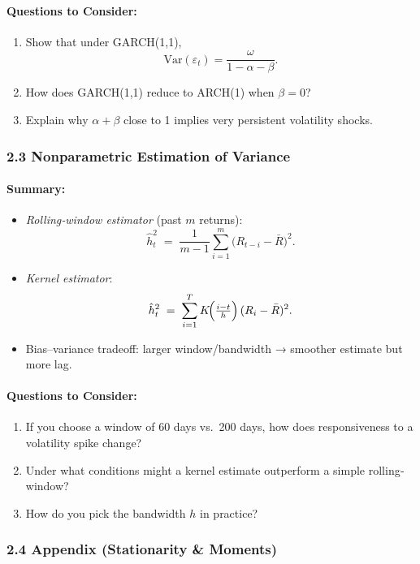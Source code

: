 \documentclass[11pt]{amsart}
\begin{document}
\paragraph{Questions to Consider:}
\begin{enumerate}[noitemsep,left=0pt]
	\item Show that under GARCH(1,1), \[\mathrm{Var}(\varepsilon_t) = \frac{\omega}{1 - \alpha - \beta}.\]
	\item How does GARCH(1,1) reduce to ARCH(1) when $\beta = 0$?
	\item Explain why $\alpha + \beta$ close to 1 implies very persistent volatility shocks.
\end{enumerate}

\subsubsection{2.3 Nonparametric Estimation of Variance}
\paragraph{Summary:}
\begin{itemize}[noitemsep,left=0pt]
	\item \emph{Rolling‐window estimator} (past $m$ returns):
	      \[
		      \hat h_t^2 \;=\; \frac{1}{m - 1}\sum_{i=1}^m \bigl(R_{t-i} - \bar{R}\bigr)^2.
	      \]
	\item \emph{Kernel estimator}:
	      \[
		      \hat h_t^2 \;=\; \sum_{i=1}^T K\!\Bigl(\tfrac{i - t}{h}\Bigr)\,(R_i - \bar{R})^2.
	      \]
	\item Bias–variance tradeoff: larger window/bandwidth → smoother estimate but more lag.
\end{itemize}

\paragraph{Questions to Consider:}
\begin{enumerate}[noitemsep,left=0pt]
	\item If you choose a window of 60 days vs.\ 200 days, how does responsiveness to a volatility spike change?
	\item Under what conditions might a kernel estimate outperform a simple rolling‐window?
	\item How do you pick the bandwidth $h$ in practice?
\end{enumerate}

\subsubsection{2.4 Appendix (Stationarity \& Moments)}
\end{document}
